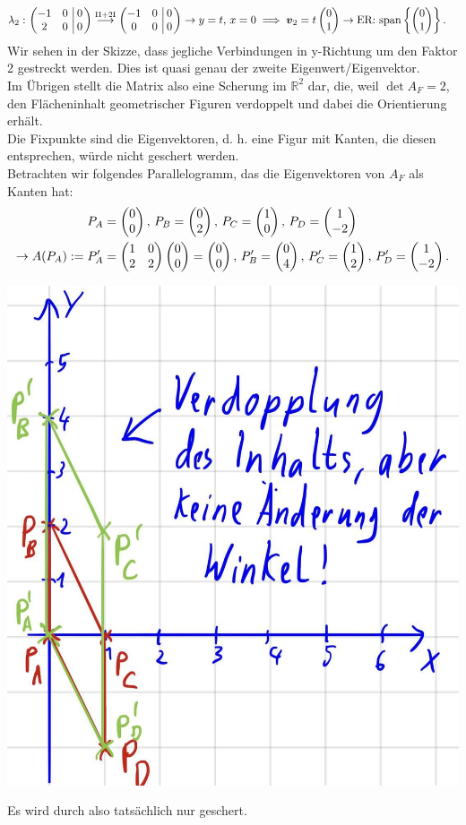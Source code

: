 \begin{Beispiel}
\begin{align*}
    \lambda_2:&\, \left(\begin{matrix}-1&0\\2&0\end{matrix}\,\left|\,\begin{matrix}0\\0\end{matrix}\right.\right)\overset{\text{II}+2\text{I}}{\longrightarrow}\left(\begin{matrix}-1&0\\0&0\end{matrix}\,\left|\,\begin{matrix}0\\0\end{matrix}\right.\right)\to y=t,\,x=0\implies {\text{\boldmath${v}$}}_2=t\begin{pmatrix}0\\1\end{pmatrix}\to\text{ER: }\text{span}\left\{\begin{pmatrix}0\\1\end{pmatrix}\right\}.
\end{align*}
Wir sehen in der Skizze, dass jegliche Verbindungen in y-Richtung um den Faktor 2 gestreckt werden. Dies ist quasi genau der zweite Eigenwert/Eigenvektor.\\
Im Übrigen stellt die Matrix also eine Scherung im $\mathbb{R}^2$ dar, die, weil $\det A_F=2$, den Flächeninhalt geometrischer Figuren verdoppelt und dabei die Orientierung erhält.\\
Die Fixpunkte sind die Eigenvektoren, d. h. eine Figur mit Kanten, die diesen entsprechen, würde nicht geschert werden.\\
Betrachten wir folgendes Parallelogramm, das die Eigenvektoren von $A_F$ als Kanten hat:
\begin{align*}
    P_A&=\begin{pmatrix}0\\0\end{pmatrix},\,P_B=\begin{pmatrix}0\\2\end{pmatrix},\,P_C=\begin{pmatrix}1\\0\end{pmatrix},\,P_D=\begin{pmatrix}1\\-2\end{pmatrix}\\
    \to A(P_A):=P_A'&=\begin{pmatrix}1&0\\2&2\end{pmatrix}\begin{pmatrix}0\\0\end{pmatrix}=\begin{pmatrix}0\\0\end{pmatrix},\,P_B'=\begin{pmatrix}0\\4\end{pmatrix},\,P_C'=\begin{pmatrix}1\\2\end{pmatrix},\,P_D'=\begin{pmatrix}1\\-2\end{pmatrix}.
\end{align*}
\begin{center}
    \includegraphics[width=.25\textwidth]{Dateien/02/02Anschauung2.jpg}
\end{center}
Es wird durch also tatsächlich nur geschert.
\end{Beispiel}


